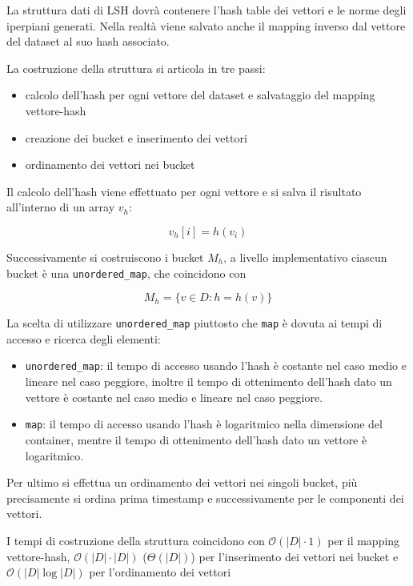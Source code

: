 La struttura dati di LSH dovrà contenere l'hash table dei vettori e le norme degli 
iperpiani generati.
Nella realtà viene salvato anche il mapping inverso dal vettore del dataset al 
suo hash associato.

La costruzione della struttura si articola in tre passi:
\begin{itemize}
    \item calcolo dell'hash per ogni vettore del dataset e salvataggio del mapping 
    vettore-hash
    \item creazione dei bucket e inserimento dei vettori
    \item ordinamento dei vettori nei bucket
\end{itemize}

Il calcolo dell'hash viene effettuato per ogni vettore e si salva il risultato 
all'interno di un array $v_h$:

$$v_h[i] = h(v_i)$$

Successivamente si costruiscono i bucket $M_h$, a livello implementativo ciascun bucket 
è una \texttt{unordered\_map}, che coincidono con 

$$M_h = \{v\in D : h = h(v)\}$$

\begin{nota}
    La scelta di utilizzare \texttt{unordered\_map} piuttosto che \texttt{map} è dovuta ai tempi di 
    accesso e ricerca degli elementi:
    \begin{itemize}
        \item \texttt{unordered\_map}: il tempo di accesso usando l'hash è costante 
        nel caso medio e lineare nel caso peggiore, inoltre il tempo di ottenimento dell'hash 
        dato un vettore è costante nel caso medio e lineare nel caso peggiore. \cite{unsorted_map_index}\cite{unsorted_map_find}
        \item \texttt{map}: il tempo di accesso usando l'hash è logaritmico nella dimensione 
        del container, mentre il tempo di ottenimento dell'hash dato un vettore è
        logaritmico. \cite{map_index}\cite{map_find}
    \end{itemize}
\end{nota}

Per ultimo si effettua un ordinamento dei vettori nei singoli bucket, più precisamente
si ordina prima timestamp e successivamente per le componenti dei vettori.

I tempi di costruzione della struttura coincidono con $\mathcal{O}(|D|\cdot 1)$
per il mapping vettore-hash, $\mathcal{O}(|D|\cdot |D|)$ ($\Theta(|D|)$) per l'inserimento 
dei vettori nei bucket e $\mathcal{O}(|D|\log |D|)$ per l'ordinamento dei vettori 

